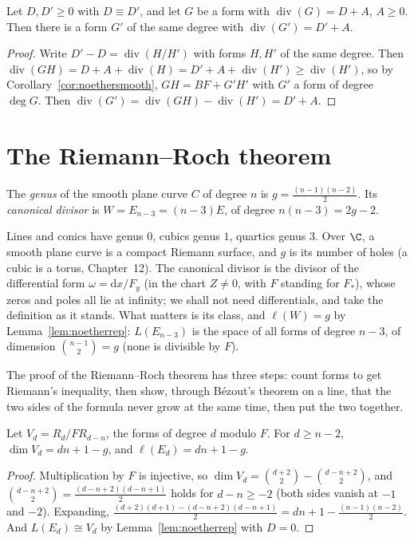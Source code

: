 \begin{theorem}\label{thm:residue}
Let $D,D'\ge0$ with $D\equiv D'$, and let $G$ be a form with $\operatorname{div}(G)=D+A$, $A\ge0$. Then there is a form $G'$ of the same degree with
$\operatorname{div}(G')=D'+A$.
\end{theorem}
\begin{proof}
Write $D'-D=\operatorname{div}(H/H')$ with forms $H,H'$ of the same degree. Then
$\operatorname{div}(GH)=D+A+\operatorname{div}(H)=D'+A+\operatorname{div}(H')\ge\operatorname{div}(H')$, so by Corollary~\ref{cor:noethersmooth},
$GH=BF+G'H'$ with $G'$ a form of degree $\deg G$. Then
$\operatorname{div}(G')=\operatorname{div}(GH)-\operatorname{div}(H')=D'+A$.
\end{proof}

\section{The Riemann--Roch theorem}

\begin{definition}
The \emph{genus} of the smooth plane curve $C$ of degree $n$ is $g=\frac{(n-1)(n-2)}2$. Its \emph{canonical divisor} is $W=E_{n-3}=(n-3)E$, of
degree $n(n-3)=2g-2$.
\end{definition}

Lines and conics have genus $0$, cubics genus $1$, quartics genus $3$. Over $\C$, a smooth plane curve is a compact Riemann surface, and $g$ is its
number of holes (a cubic is a torus, Chapter~12). The canonical divisor is the divisor of the differential form $\omega=\mathrm dx/F_y$ (in the
chart $Z\ne0$, with $F$ standing for $F_*$), whose zeros and poles all lie at infinity; we shall not need differentials, and take the definition as
it stands. What matters is its class, and $\ell(W)=g$ by Lemma~\ref{lem:noetherrep}: $L(E_{n-3})$ is the space of all forms of degree $n-3$, of
dimension $\binom{n-1}2=g$ (none is divisible by $F$).

The proof of the Riemann--Roch theorem has three steps: count forms to get Riemann's inequality, then show, through B\'ezout's theorem on a line, that the
two sides of the formula never grow at the same time, then put the two together.

\begin{proposition}\label{prop:countforms}
Let $V_d=R_d/FR_{d-n}$, the forms of degree $d$ modulo $F$. For $d\ge n-2$, $\dim V_d=dn+1-g$, and $\ell(E_d)=dn+1-g$.
\end{proposition}
\begin{proof}
Multiplication by $F$ is injective, so $\dim V_d=\binom{d+2}2-\binom{d-n+2}2$, and $\binom{d-n+2}2=\frac{(d-n+2)(d-n+1)}2$ holds for $d-n\ge-2$ (both sides vanish at $-1$ and $-2$).
Expanding, $\frac{(d+2)(d+1)-(d-n+2)(d-n+1)}2=dn+1-\frac{(n-1)(n-2)}2$. And $L(E_d)\cong V_d$ by Lemma~\ref{lem:noetherrep} with $D=0$.
\end{proof}

